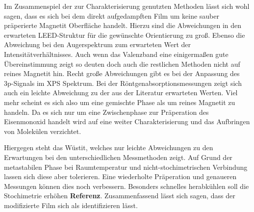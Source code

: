         Im Zusammenspiel der zur Charakterisierung genutzten Methoden lässt sich wohl sagen, dass es sich bei dem direkt aufgedampften Film um keine sauber präperierte Magnetit Oberfläche handelt.
        Hierzu sind die Abweichungen in den erwarteten LEED-Struktur für die gewünschte Orientierung zu groß.
        Ebenso die Abweichung bei den Augerspektrum zum erwarteten Wert der Intensitätverhältnisses.
        Auch wenn das Valenzband eine einigermaßen gute Übereinstimmung zeigt so deuten doch auch die restlichen Methoden nicht auf reines Magnetit hin.
        Recht große Abweichungen gibt es bei der Anpassung des 3p-Signals im XPS Spektrum.
        Bei der Röntgenabsorptionsmessungen zeigt sich auch ein leichte Abweichung zu der aus der Literatur erwarteten Werten.
        Viel mehr scheint es sich also um eine gemischte Phase als um reines Magnetit zu handeln.
        Da es sich nur um eine Zwischenphase zur Präperation des Eisenmonoxid handelt wird auf eine weiter Charakterisierung und das Aufbringen von Molekülen verzichtet.

        Hiergegen steht das Wüstit, welches nur leichte Abweichungen zu den Erwartungen bei den unterschiedlichen Messmethoden zeigt.
        Auf Grund der metastabilen Phase bei Raumtemperatur und nicht-stochimetrischen Verbindung lassen sich diese aber tolerieren.
        Eine wiederholte Präperation und genaueren Messungen können dies noch verbessern.
        Besonders schnelles herabkühlen soll die Stochimetrie erhöhen \textbf{Referenz}.
        Zusammenfassend lässt sich sagen, dass der modifizierte Film sich als  identifizieren lässt.

